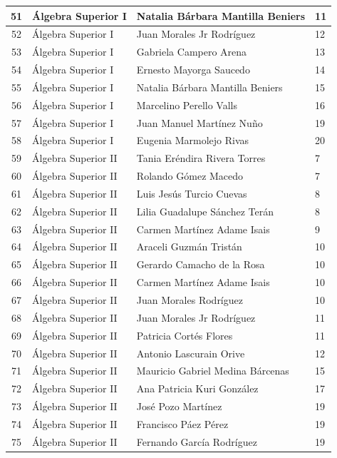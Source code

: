 {\begin{longtable}{|c|p{6.5cm}|p{5cm}|p{1.5cm}|}
51 & Álgebra Superior I & Natalia Bárbara Mantilla Beniers & 11 \\ \hline
52 & Álgebra Superior I & Juan Morales Jr Rodríguez & 12 \\ \hline
53 & Álgebra Superior I & Gabriela Campero Arena & 13 \\ \hline
54 & Álgebra Superior I & Ernesto Mayorga Saucedo & 14 \\ \hline
55 & Álgebra Superior I & Natalia Bárbara Mantilla Beniers & 15 \\ \hline
56 & Álgebra Superior I & Marcelino Perello Valls & 16 \\ \hline
57 & Álgebra Superior I & Juan Manuel Martínez Nuño & 19 \\ \hline
58 & Álgebra Superior I & Eugenia Marmolejo Rivas & 20 \\ \hline
59 & Álgebra Superior II & Tania Eréndira Rivera Torres & 7 \\ \hline
60 & Álgebra Superior II & Rolando Gómez Macedo & 7 \\ \hline
61 & Álgebra Superior II & Luis Jesús Turcio Cuevas & 8 \\ \hline
62 & Álgebra Superior II & Lilia Guadalupe Sánchez Terán & 8 \\ \hline
63 & Álgebra Superior II & Carmen Martínez Adame Isais & 9 \\ \hline
64 & Álgebra Superior II & Araceli Guzmán Tristán & 10 \\ \hline
65 & Álgebra Superior II & Gerardo Camacho de la Rosa & 10 \\ \hline
66 & Álgebra Superior II & Carmen Martínez Adame Isais & 10 \\ \hline
67 & Álgebra Superior II & Juan Morales Rodríguez & 10 \\ \hline
68 & Álgebra Superior II & Juan Morales Jr Rodríguez & 11 \\ \hline
69 & Álgebra Superior II & Patricia Cortés Flores & 11 \\ \hline
70 & Álgebra Superior II & Antonio Lascurain Orive & 12 \\ \hline
71 & Álgebra Superior II & Mauricio Gabriel Medina Bárcenas & 15 \\ \hline
72 & Álgebra Superior II & Ana Patricia Kuri González & 17 \\ \hline
73 & Álgebra Superior II & José Pozo Martínez & 19 \\ \hline
74 & Álgebra Superior II & Francisco Páez Pérez & 19 \\ \hline
75 & Álgebra Superior II & Fernando García Rodríguez & 19 \\ \hline

\end{longtable}}
